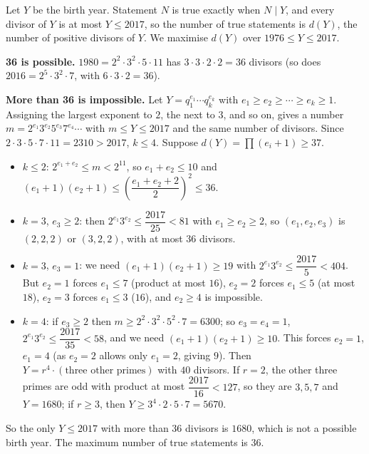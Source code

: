 Let $Y$ be the birth year. Statement $N$ is true exactly when $N\mid Y$, and every divisor of $Y$ is at most $Y\le2017$, so the number of true statements is $d(Y)$, the number of positive divisors of $Y$. We maximise $d(Y)$ over $1976\le Y\le2017$.

\textbf{36 is possible.} $1980=2^2\cdot3^2\cdot5\cdot11$ has $3\cdot3\cdot2\cdot2=36$ divisors (so does $2016=2^5\cdot3^2\cdot7$, with $6\cdot3\cdot2=36$).

\textbf{More than 36 is impossible.} Let $Y=q_1^{e_1}\cdots q_k^{e_k}$ with $e_1\ge e_2\ge\cdots\ge e_k\ge1$. Assigning the largest exponent to $2$, the next to $3$, and so on, gives a number $m=2^{e_1}3^{e_2}5^{e_3}7^{e_4}\cdots$ with $m\le Y\le2017$ and the same number of divisors. Since $2\cdot3\cdot5\cdot7\cdot11=2310>2017$, $k\le4$. Suppose $d(Y)=\prod(e_i+1)\ge37$.
\begin{itemize}
\item $k\le2$: $2^{e_1+e_2}\le m<2^{11}$, so $e_1+e_2\le10$ and $(e_1+1)(e_2+1)\le\left(\dfrac{e_1+e_2+2}{2}\right)^2\le36$.
\item $k=3$, $e_3\ge2$: then $2^{e_1}3^{e_2}\le\dfrac{2017}{25}<81$ with $e_1\ge e_2\ge2$, so $(e_1,e_2,e_3)$ is $(2,2,2)$ or $(3,2,2)$, with at most $36$ divisors.
\item $k=3$, $e_3=1$: we need $(e_1+1)(e_2+1)\ge19$ with $2^{e_1}3^{e_2}\le\dfrac{2017}{5}<404$. But $e_2=1$ forces $e_1\le7$ (product at most $16$), $e_2=2$ forces $e_1\le5$ (at most $18$), $e_2=3$ forces $e_1\le3$ ($16$), and $e_2\ge4$ is impossible.
\item $k=4$: if $e_3\ge2$ then $m\ge2^2\cdot3^2\cdot5^2\cdot7=6300$; so $e_3=e_4=1$, $2^{e_1}3^{e_2}\le\dfrac{2017}{35}<58$, and we need $(e_1+1)(e_2+1)\ge10$. This forces $e_2=1$, $e_1=4$ (as $e_2=2$ allows only $e_1=2$, giving $9$). Then $Y=r^4\cdot(\text{three other primes})$ with $40$ divisors. If $r=2$, the other three primes are odd with product at most $\dfrac{2017}{16}<127$, so they are $3,5,7$ and $Y=1680$; if $r\ge3$, then $Y\ge3^4\cdot2\cdot5\cdot7=5670$.
\end{itemize}
So the only $Y\le2017$ with more than $36$ divisors is $1680$, which is not a possible birth year. The maximum number of true statements is $\boxed{36}$.
